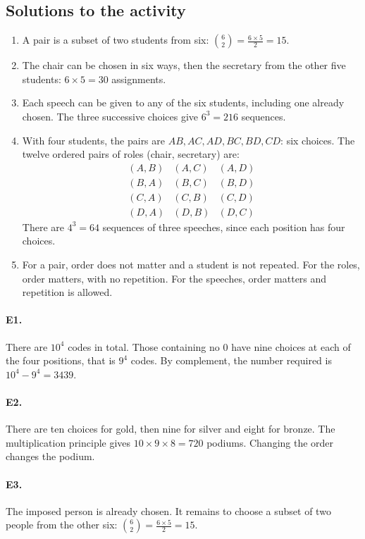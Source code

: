 \subsection{Solutions to the activity}\begin{enumerate}
\item A pair is a subset of two students from six: $\binom{6}{2}=\frac{6\times5}{2}=15$.
\item The chair can be chosen in six ways, then the secretary from the other five students: $6\times5=30$ assignments.
\item Each speech can be given to any of the six students, including one already chosen. The three successive choices give $6^3=216$ sequences.
\item With four students, the pairs are $AB,AC,AD,BC,BD,CD$: six choices. The twelve ordered pairs of roles (chair, secretary) are:\[\begin{array}{lll}(A,B)&(A,C)&(A,D)\\(B,A)&(B,C)&(B,D)\\(C,A)&(C,B)&(C,D)\\(D,A)&(D,B)&(D,C)\end{array}\] There are $4^3=64$ sequences of three speeches, since each position has four choices.
\item For a pair, order does not matter and a student is not repeated. For the roles, order matters, with no repetition. For the speeches, order matters and repetition is allowed.
\end{enumerate}

\paragraph{E1.}There are $10^4$ codes in total. Those containing no $0$ have nine choices at each of the four positions, that is $9^4$ codes. By complement, the number required is $10^4-9^4=3439$.

\paragraph{E2.}There are ten choices for gold, then nine for silver and eight for bronze. The multiplication principle gives $10\times9\times8=720$ podiums. Changing the order changes the podium.

\paragraph{E3.}The imposed person is already chosen. It remains to choose a subset of two people from the other six: $\binom{6}{2}=\frac{6\times5}{2}=15$.

